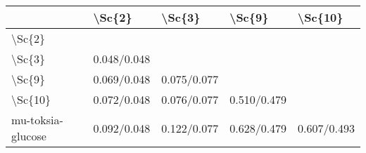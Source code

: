 \begin{tabular}{lllll}
\toprule
{} &       \textbackslash Sc\{2\} &       \textbackslash Sc\{3\} &       \textbackslash Sc\{9\} &      \textbackslash Sc\{10\} \\
\midrule
\textbackslash Sc\{2\}            &              &              &              &              \\
\textbackslash Sc\{3\}            &  0.048/0.048 &              &              &              \\
\textbackslash Sc\{9\}            &  0.069/0.048 &  0.075/0.077 &              &              \\
\textbackslash Sc\{10\}           &  0.072/0.048 &  0.076/0.077 &  0.510/0.479 &              \\
mu-toksia-glucose &  0.092/0.048 &  0.122/0.077 &  0.628/0.479 &  0.607/0.493 \\
\bottomrule
\end{tabular}

